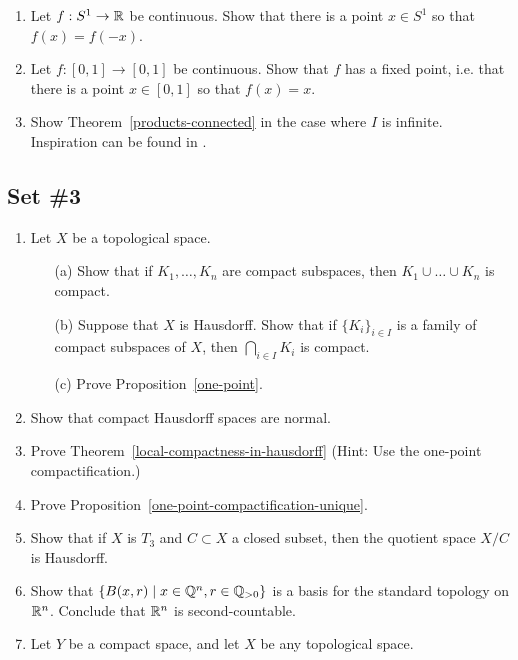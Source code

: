 \begin{enumerate}[label=2.\arabic*]
  \item Let $f : S^1 \to \mathbb{R}$ be continuous. Show that there is a point $x \in S^1$ so that $f(x) = f(-x)$.
  \item Let $f : [0,1] \to [0,1]$ be continuous. Show that $f$ has a fixed point, i.e. that there is a point $x \in [0,1]$ so that $f(x) = x$.
  \item \label{exercise-products-connected} Show Theorem~\ref{products-connected} in the case where $I$ is infinite. Inspiration can be found in \cite[Ex.~23.7]{Mun}.
\end{enumerate}

\subsection{Set \#3}
  \begin{enumerate}[label=3.\arabic*]
    \item \label{one-point-exercise}Let $X$ be a topological space.
    \begin{itemize}
      \item[(a)] Show that if $K_1, \dots, K_n$ are compact subspaces, then $K_1 \cup \dots \cup K_n$ is compact.
      \item[(b)] Suppose that $X$ is Hausdorff. Show that if $\{K_i\}_{i \in I}$ is a family of compact subspaces of $X$, then $\bigcap_{i \in I} K_i$ is compact.
      \item[(c)] Prove Proposition~\ref{one-point}.
    \end{itemize}
    \item \label{compact-hausdorff-are-normal-exercise} Show that compact Hausdorff spaces are normal.
    \item \label{local-compactness-in-hausdorff-exercise}Prove Theorem~\ref{local-compactness-in-hausdorff} (Hint: Use the one-point compactification.)
    \item \label{one-point-compactification-unique-exercise}Prove Proposition~\ref{one-point-compactification-unique}.
    \item Show that if $X$ is $T_3$ and $C \subset X$ a closed subset, then the quotient space $X/C$ is Hausdorff.
    \item \label{second-countable-exercise}Show that $\{B(x,r) \mid x \in \mathbb{Q}^n, r \in \mathbb{Q}_{> 0}\}$ is a basis for the standard topology on $\mathbb{R}^n$. Conclude that $\mathbb{R}^n$ is second-countable.
    \item Let $Y$ be a compact space, and let $X$ be any topological space.
      \begin{itemize}

\end{itemize}
\end{enumerate}
